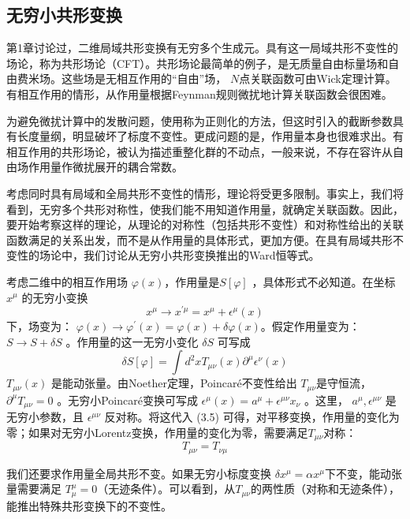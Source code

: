 \subsection{无穷小共形变换}

第1章讨论过，二维局域共形变换有无穷多个生成元。具有这一局域共形不变性的场论，称为共形场论（CFT）。共形场论最简单的例子，是无质量自由标量场和自由费米场。这些场是无相互作用的“自由”场， $N $点关联函数可由Wick定理计算。有相互作用的情形，从作用量根据Feynman规则微扰地计算关联函数会很困难。

为避免微扰计算中的发散问题，使用称为正则化的方法，但这时引入的截断参数具有长度量纲，明显破坏了标度不变性。更成问题的是，作用量本身也很难求出。有相互作用的共形场论，被认为描述重整化群的不动点，一般来说，不存在容许从自由场作用量作微扰展开的耦合常数。

考虑同时具有局域和全局共形不变性的情形，理论将受更多限制。事实上，我们将看到，无穷多个共形对称性，使我们能不用知道作用量，就确定关联函数。因此，要开始考察这样的理论，从理论的对称性（包括共形不变性）和对称性给出的关联函数满足的关系出发，而不是从作用量的具体形式，更加方便。在具有局域共形不变性的场论中，我们讨论从无穷小共形变换推出的Ward恒等式。

考虑二维中的相互作用场 $\varphi(x) $，作用量是$ S[\varphi]$ ，具体形式不必知道。在坐标$ x^\mu$ 的无穷小变换
\begin{equation}
x^{\mu} \rightarrow x^{\prime \mu}=x^{\mu}+\epsilon^{\mu}(x)
\end{equation}
下，场变为： $\varphi(x) \rightarrow \varphi^{\prime}(x)=\varphi(x)+\delta \varphi(x) $。假定作用量变为： $S \rightarrow S+\delta S$ 。作用量的这一无穷小变化 $\delta S$ 可写成
\begin{equation}
\delta S[\varphi]=\int d^{2} x T_{\mu \nu}(x) \partial^{\mu} \epsilon^{\nu}(x)
\end{equation}
$T_{\mu\nu}(x)$ 是能动张量。由Noether定理，Poincaré不变性给出 $T_{\mu\nu} $是守恒流，$ \partial^\mu T_{\mu\nu}=0$ 。无穷小Poincaré变换可写成 $\epsilon^{\mu}(x)=a^{\mu}+\epsilon^{\mu \nu} x_{\nu}$ 。这里， $a^\mu,\epsilon^{\mu\nu}$ 是无穷小参数，且 $\epsilon^{\mu\nu}$ 反对称。将这代入 (3.5) 可得，对平移变换，作用量的变化为零；如果对无穷小Lorentz变换，作用量的变化为零，需要满足$ T_{\mu\nu} $对称：
\begin{equation}
	T_{\mu \nu}=T_{\nu \mu}
\end{equation}

我们还要求作用量全局共形不变。如果无穷小标度变换 $\delta x^\mu=\alpha x^\mu $下不变，能动张量需要满足 $T^\mu_\mu=0 $（无迹条件）。可以看到，从$ T_{\mu\nu} $的两性质（对称和无迹条件），能推出特殊共形变换下的不变性。

